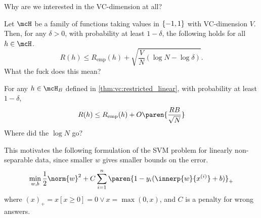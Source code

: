Why are we interested in the VC-dimension at all?
\begin{fact*} \label{thm:vc:bound}
    Let $\mcH$ be a family of functions taking values in $\{-1, 1\}$
    with VC-dimension $V$.
    Then, for any $\delta > 0$, with probability at least $1-\delta$,
    the following holds for all $h \in \mcH$. \[
        R(h) \le R_{\text{emp}}(h)
            + \sqrt{\frac{V}{N} (\log N - \log \delta)}.
    \]
    \textcolor{exercise}{What the fuck does this mean?}
\end{fact*}

\begin{corollary}
    For any $h \in \mcH_B$ defined in \cref{thm:vc:restricted_linear},
    with probability at least $1-\delta$, \[
        R(h) \le R_{\text{emp}}(h)
            + O\paren{\frac{RB}{\sqrt N}}
    \]
    \textcolor{exercise}{Where did the $\log N$ go?}
\end{corollary}

This motivates the following formulation of the SVM problem for
linearly non-separable data, since smaller $w$ gives smaller bounds on
the error.
\[
    \min_{w, b} \frac12 \norm{w}^2
        + C \sum_{i=1}^{n} \paren{1 - y_i (\innerp{w}{x^{(i)}} + b)}_+
\] where $(x)_+ = x [x \ge 0] = 0 \vee x = \max(0, x)$,
and $C$ is a penalty for wrong answers.
